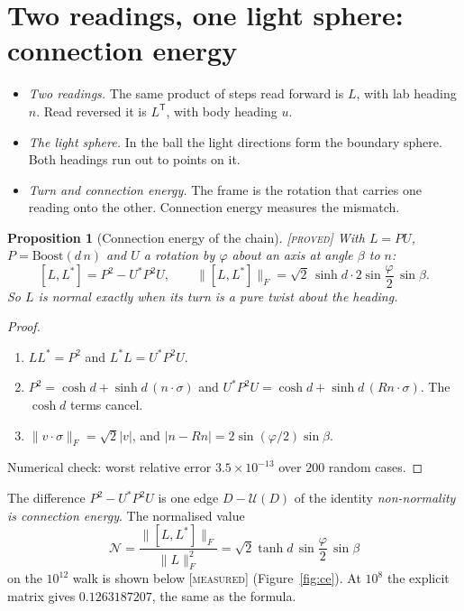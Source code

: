 \documentclass[11pt]{article}
\newtheorem{proposition}{Proposition}
\theoremstyle{definition}
\theoremstyle{remark}
\newcommand{\grade}[1]{\textsc{[#1]}}
\begin{document}
\section{Two readings, one light sphere: connection energy}

\begin{itemize}
\item \emph{Two readings.} The same product of steps read forward is $L$, with lab heading $n$. Read reversed it is $L^{\mathsf T}$, with body heading $u$.
\item \emph{The light sphere.} In the ball the light directions form the boundary sphere. Both headings run out to points on it.
\item \emph{Turn and connection energy.} The frame is the rotation that carries one reading onto the other. Connection energy measures the mismatch.
\end{itemize}

\begin{proposition}[Connection energy of the chain] \grade{proved}
With $L=PU$, $P=\mathrm{Boost}(d\,n)$ and $U$ a rotation by $\varphi$ about an axis at angle $\beta$ to $n$:
\[
[L,L^*]=P^2-U^*P^2U,\qquad
\|[L,L^*]\|_F=\sqrt2\,\sinh d\cdot 2\sin\frac\varphi2\,\sin\beta .
\]
So $L$ is normal exactly when its turn is a pure twist about the heading.
\end{proposition}
\begin{proof}
\begin{enumerate}
\item $LL^*=P^2$ and $L^*L=U^*P^2U$.
\item $P^2=\cosh d+\sinh d\,(n\cdot\sigma)$ and $U^*P^2U=\cosh d+\sinh d\,(Rn\cdot\sigma)$. The $\cosh d$ terms cancel.
\item $\|v\cdot\sigma\|_F=\sqrt2|v|$, and $|n-Rn|=2\sin(\varphi/2)\sin\beta$.
\end{enumerate}
Numerical check: worst relative error $3.5\times10^{-13}$ over $200$ random cases.
\end{proof}

\noindent The difference $P^2-U^*P^2U$ is one edge $D-\mathcal U(D)$ of the identity \emph{non-normality is connection energy}. The normalised value
\[
\mathcal N=\frac{\|[L,L^*]\|_F}{\|L\|_F^2}=\sqrt2\tanh d\,\sin\frac\varphi2\,\sin\beta
\]
on the $10^{12}$ walk is shown below \grade{measured} (Figure~\ref{fig:ce}). At $10^8$ the explicit matrix gives $0.1263187207$, the same as the formula.
\end{document}

